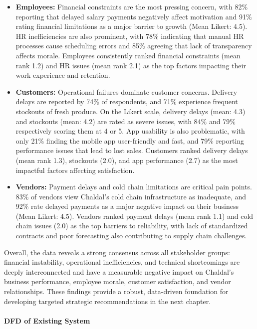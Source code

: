 \documentclass[12pt,a4paper]{article}
\begin{document}
\begin{itemize}
    \item \textbf{Employees:} Financial constraints are the most pressing concern, with 82\% reporting that delayed salary payments negatively affect motivation and 91\% rating financial limitations as a major barrier to growth (Mean Likert: 4.5). HR inefficiencies are also prominent, with 78\% indicating that manual HR processes cause scheduling errors and 85\% agreeing that lack of transparency affects morale. Employees consistently ranked financial constraints (mean rank 1.2) and HR issues (mean rank 2.1) as the top factors impacting their work experience and retention.
    \item \textbf{Customers:} Operational failures dominate customer concerns. Delivery delays are reported by 74\% of respondents, and 71\% experience frequent stockouts of fresh produce. On the Likert scale, delivery delays (mean: 4.3) and stockouts (mean: 4.2) are rated as severe issues, with 84\% and 79\% respectively scoring them at 4 or 5. App usability is also problematic, with only 21\% finding the mobile app user-friendly and fast, and 79\% reporting performance issues that lead to lost sales. Customers ranked delivery delays (mean rank 1.3), stockouts (2.0), and app performance (2.7) as the most impactful factors affecting satisfaction.
    \item \textbf{Vendors:} Payment delays and cold chain limitations are critical pain points. 83\% of vendors view Chaldal’s cold chain infrastructure as inadequate, and 92\% rate delayed payments as a major negative impact on their business (Mean Likert: 4.5). Vendors ranked payment delays (mean rank 1.1) and cold chain issues (2.0) as the top barriers to reliability, with lack of standardized contracts and poor forecasting also contributing to supply chain challenges.
\end{itemize}

Overall, the data reveals a strong consensus across all stakeholder groups: financial instability, operational inefficiencies, and technical shortcomings are deeply interconnected and have a measurable negative impact on Chaldal’s business performance, employee morale, customer satisfaction, and vendor relationships. These findings provide a robust, data-driven foundation for developing targeted strategic recommendations in the next chapter.




\paragraph{DFD of Existing System}
\end{document}
